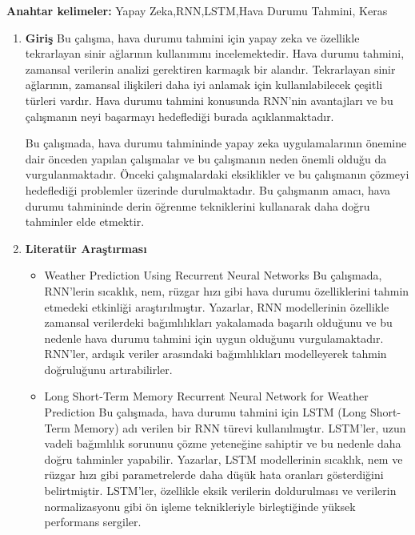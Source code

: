 \documentclass[12pt,a4paper]{article}
\begin{document}
{\bf\fontsize{12pt}{14pt}\selectfont Anahtar kelimeler:}
Yapay Zeka,RNN,LSTM,Hava Durumu Tahmini, Keras
  \newpage
	\begin{enumerate}

	\item {\bf\fontsize{12pt}{14pt}\selectfont Giriş}\newline\newline
Bu çalışma, hava durumu tahmini için yapay zeka ve özellikle tekrarlayan sinir ağlarının kullanımını incelemektedir. Hava durumu tahmini, zamansal verilerin analizi gerektiren karmaşık bir alandır. Tekrarlayan sinir ağlarının, zamansal ilişkileri daha iyi anlamak için kullanılabilecek çeşitli türleri vardır. Hava durumu tahmini konusunda RNN'nin avantajları ve bu çalışmanın neyi başarmayı hedeflediği burada açıklanmaktadır.

Bu çalışmada, hava durumu tahmininde yapay zeka uygulamalarının önemine dair önceden yapılan çalışmalar ve bu çalışmanın neden önemli olduğu da vurgulanmaktadır. Önceki çalışmalardaki eksiklikler ve bu çalışmanın çözmeyi hedeflediği problemler üzerinde durulmaktadır. Bu çalışmanın amacı, hava durumu tahmininde derin öğrenme tekniklerini kullanarak daha doğru tahminler elde etmektir.

    

\item  {\bf\fontsize{12pt}{14pt}\selectfont Literatür Araştırması}\newline\newline
\begin{itemize}
\item  Weather Prediction Using Recurrent Neural Networks
Bu çalışmada, RNN'lerin sıcaklık, nem, rüzgar hızı gibi hava durumu özelliklerini tahmin etmedeki etkinliği araştırılmıştır. Yazarlar, RNN modellerinin özellikle zamansal verilerdeki bağımlılıkları yakalamada başarılı olduğunu ve bu nedenle hava durumu tahmini için uygun olduğunu vurgulamaktadır. RNN'ler, ardışık veriler arasındaki bağımlılıkları modelleyerek tahmin doğruluğunu artırabilirler\cite{L1}.

\item Long Short-Term Memory Recurrent Neural Network for Weather Prediction
Bu çalışmada, hava durumu tahmini için LSTM (Long Short-Term Memory) adı verilen bir RNN türevi kullanılmıştır. LSTM'ler, uzun vadeli bağımlılık sorununu çözme yeteneğine sahiptir ve bu nedenle daha doğru tahminler yapabilir. Yazarlar, LSTM modellerinin sıcaklık, nem ve rüzgar hızı gibi parametrelerde daha düşük hata oranları gösterdiğini belirtmiştir. LSTM'ler, özellikle eksik verilerin doldurulması ve verilerin normalizasyonu gibi ön işleme teknikleriyle birleştiğinde yüksek performans sergiler\cite{L2}.


\end{itemize}
\end{enumerate}
\end{document}
